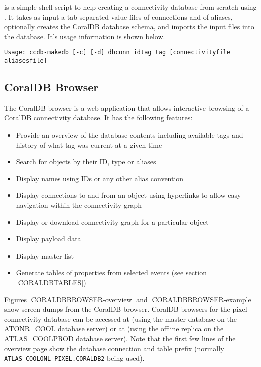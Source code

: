  is a simple shell script to help creating a connectivity database from scratch using
. It takes as input a tab-separated-value files of connections and of aliases, optionally creates the CoralDB database schema, and imports the input files into the database. It's usage information is shown below.

\begingroup
\small

\begin{verbatim}
Usage: ccdb-makedb [-c] [-d] dbconn idtag tag [connectivityfile aliasesfile]
\end{verbatim}

\endgroup



\clearpage
\subsection{CoralDB Browser}


The CoralDB browser is a web application that allows interactive browsing of a
CoralDB connectivity database. It has the following features:
\begin{itemize}
\item Provide an overview of the database contents including available tags and history of what tag was current at a given time
\item Search for objects by their ID, type or aliases
\item Display names using IDs or any other alias convention
\item Display connections to and from an object using hyperlinks to allow easy navigation within the connectivity graph
\item Display or download connectivity graph for a particular object
\item Display payload data
\item Display master list
\item Generate tables of properties from selected events (see section \ref{CORALDBTABLES})
\end{itemize}

Figures \ref{CORALDBBROWSER-overview} and \ref{CORALDBBROWSER-example} show screen dumps from the CoralDB browser. CoralDB browsers
for the pixel connectivity database can be accessed at \cite{CORALDBBROWSER-url} (using the master database on the
ATONR\_COOL database server) or at \cite{CORALDBBROWSER-replica-url} (using the offline replica on the ATLAS\_COOLPROD database server). Note that the first few lines of the overview page show the database connection and table prefix (normally
{\tt ATLAS\_COOLONL\_PIXEL.CORALDB2} being used).

